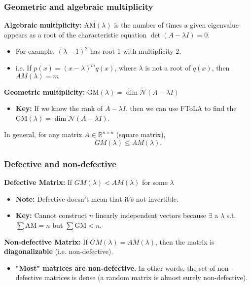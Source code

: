 \subsubsection{Geometric and algebraic multiplicity}
\begin{definition}

    \textbf{Algebraic multiplicity:} $\text{AM}(\lambda)$ is the number of times a given eigenvalue appears as a root of the characteristic equation $\det(A - \lambda I) = 0$.
    \begin{itemize}
        \item For example, $(\lambda - 1)^2$ has root 1 with multiplicity 2.
        \item i.e. If $p(x)=(x-\lambda)^m q(x)$, where $\lambda$ is not a root of $q(x)$, then $AM(\lambda)=m$
    \end{itemize}
    \vspace{1em}

    \textbf{Geometric multiplicity:} $\text{GM}(\lambda) = \dim \mathcal{N}(A - \lambda I)$
    \begin{itemize}
        \item \textbf{Key:} If we know the rank of $A - \lambda I$, then we can use FToLA to find the $\text{GM}(\lambda) = \dim \mathcal{N}(A - \lambda I)$.
    \end{itemize}
\end{definition}

\begin{theorem}
    In general, for any matrix $A \in \mathbb{R}^{n \times n}$ (square matrix),
    \[
    GM(\lambda) \leq AM(\lambda).
    \]
\end{theorem}

\subsubsection{Defective and non-defective}
\begin{definition}

    \textbf{Defective Matrix:} If $GM(\lambda) < AM(\lambda)$ for some $\lambda$
    \begin{itemize}
        \item \textbf{Note:} Defective doesn't mean that it's not invertible.
        \item \textbf{Key:} Cannot construct $n$ linearly independent vectors because $\exists$ a $\lambda$ s.t. $\sum \text{AM} = n$ but $\sum \text{GM} < n$.  
    \end{itemize}
    \vspace{1em}

    \textbf{Non-defective Matrix:} If $GM(\lambda) = AM(\lambda)$, then the matrix is \textbf{diagonalizable} (i.e. non-defective).
    \begin{itemize}
        \item \textbf{"Most" matrices are non-defective.} In other words, the set of non-defective matrices is dense (a random matrix is almost surely non-defective).
    \end{itemize}

\end{definition}

